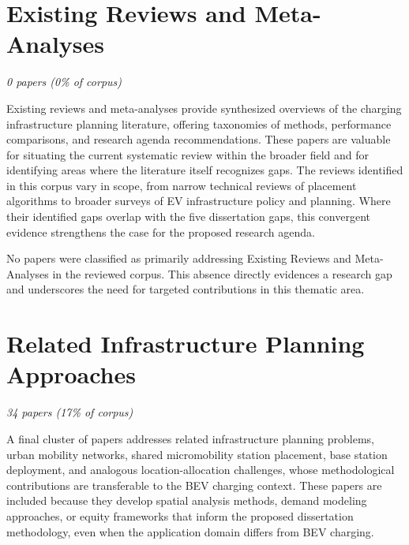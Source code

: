 \documentclass[letterpaper, 12pt, oneside, doublespacing]{Thesis}
\begin{document}
\section{Existing Reviews and Meta-Analyses}

\textit{0 papers (0\% of corpus)}

Existing reviews and meta-analyses provide synthesized overviews of the charging infrastructure planning literature, offering taxonomies of methods, performance comparisons, and research agenda recommendations. These papers are valuable for situating the current systematic review within the broader field and for identifying areas where the literature itself recognizes gaps. The reviews identified in this corpus vary in scope, from narrow technical reviews of placement algorithms to broader surveys of EV infrastructure policy and planning. Where their identified gaps overlap with the five dissertation gaps, this convergent evidence strengthens the case for the proposed research agenda.

No papers were classified as primarily addressing Existing Reviews and Meta-Analyses in the reviewed corpus. This absence directly evidences a research gap and underscores the need for targeted contributions in this thematic area.

\section{Related Infrastructure Planning Approaches}

\textit{34 papers (17\% of corpus)}

A final cluster of papers addresses related infrastructure planning problems, urban mobility networks, shared micromobility station placement, base station deployment, and analogous location-allocation challenges, whose methodological contributions are transferable to the BEV charging context. These papers are included because they develop spatial analysis methods, demand modeling approaches, or equity frameworks that inform the proposed dissertation methodology, even when the application domain differs from BEV charging.
\end{document}
